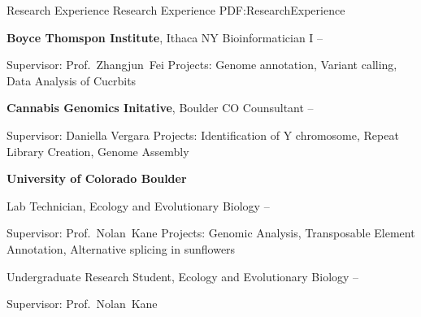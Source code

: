 \documentclass[letterpaper,MMMyyyy,nonstopmode]{simpleresumecv}
\begin{document}
\begin{Body}
\begin{Detail}
\end{Detail}


\Section
{Research Experience}
{Research Experience}
{PDF:ResearchExperience}

\Entry
{\textbf{Boyce Thomspon Institute}}, Ithaca NY
\Gap
\BulletItem
Bioinformatician I
\hfill
{} --
\begin{Detail}
\SubBulletItem
Supervisor:
Prof.~Zhangjun~Fei
\SubBulletItem
Projects:
Genome annotation, Variant calling, Data Analysis of Cucrbits
\end{Detail}


\Entry
{\textbf{Cannabis Genomics Initative}}, Boulder CO 
\Gap
\BulletItem
Counsultant
\hfill
{} --
\begin{Detail}
\SubBulletItem
Supervisor:
Daniella Vergara
\SubBulletItem
Projects:
Identification of Y chromosome, Repeat Library Creation, Genome Assembly
\end{Detail}

\Entry
{\textbf{University of Colorado Boulder}}

\Gap
\BulletItem
Lab Technician, Ecology and Evolutionary Biology
\hfill
{} --
\begin{Detail}
\SubBulletItem
Supervisor:
Prof.~Nolan~Kane
\SubBulletItem
Projects:
Genomic Analysis, Transposable Element Annotation, Alternative splicing in sunflowers
\end{Detail}

\Entry

\Gap
\BulletItem
Undergraduate Research Student, Ecology and Evolutionary Biology
\hfill
{} --
\begin{Detail}
\SubBulletItem
Supervisor:
Prof.~Nolan~Kane
\end{Detail}


\end{Body}
\end{document}
